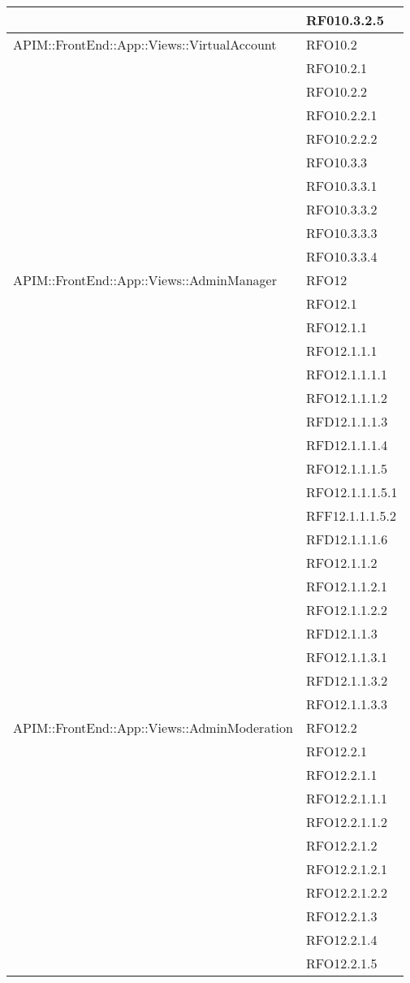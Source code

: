 \begin{longtable}{ p{12cm} | p{4cm} }
			& RF010.3.2.5 \\
			\hline
			APIM::FrontEnd::App::Views::VirtualAccount
			& RFO10.2 \\
			& RFO10.2.1 \\
			& RFO10.2.2 \\
			& RFO10.2.2.1 \\
			& RFO10.2.2.2 \\
			& RFO10.3.3 \\
			& RFO10.3.3.1 \\
			& RFO10.3.3.2 \\
			& RFO10.3.3.3 \\
			& RFO10.3.3.4 \\
			\hline
			APIM::FrontEnd::App::Views::AdminManager
			& RFO12 \\
			& RFO12.1 \\
			& RFO12.1.1 \\
			& RFO12.1.1.1 \\
			& RFO12.1.1.1.1 \\
			& RFO12.1.1.1.2 \\
			& RFD12.1.1.1.3 \\
			& RFD12.1.1.1.4 \\
			& RFO12.1.1.1.5 \\
			& RFO12.1.1.1.5.1 \\
			& RFF12.1.1.1.5.2 \\
			& RFD12.1.1.1.6 \\
			& RFO12.1.1.2 \\
			& RFO12.1.1.2.1 \\
			& RFO12.1.1.2.2 \\
			& RFD12.1.1.3 \\
			& RFO12.1.1.3.1 \\
			& RFD12.1.1.3.2 \\
			& RFO12.1.1.3.3 \\
			\hline
			APIM::FrontEnd::App::Views::AdminModeration
			& RFO12.2 \\
			& RFO12.2.1 \\
			& RFO12.2.1.1 \\
			& RFO12.2.1.1.1 \\
			& RFO12.2.1.1.2 \\
			& RFO12.2.1.2 \\
			& RFO12.2.1.2.1 \\
			& RFO12.2.1.2.2 \\
			& RFO12.2.1.3 \\
			& RFO12.2.1.4 \\
			& RFO12.2.1.5 \\

\end{longtable}
